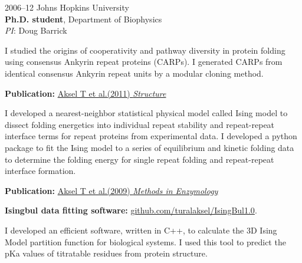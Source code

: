 \documentclass[12pt,letterpaper]{report}
\newcommand{\listitemspace}{0.25em}
\renewenvironment{itemize}
{\begin{list}{}{\setlength{\leftmargin}{0em}
                \setlength{\parskip}{0em}
                \setlength{\itemsep}{\listitemspace}
                \setlength{\parsep}{\listitemspace}}}
{\end{list}}
\begin{document}
\begin{tablist}
        \item[2006--12]\tab{}Johns Hopkins University \\
                             \textbf{Ph.D. student}, Department of Biophysics\\
                             \textit{PI}: Doug Barrick \\
                             \begin{itemize}
                                \item \textbullet \hspace{0.2cm} I studied the origins of cooperativity and pathway diversity in protein folding using consensus Ankyrin repeat proteins (CARPs). I generated CARPs from identical consensus Ankyrin repeat units by a modular cloning method. 
                                \begin{itemize}
                                    \item \hspace{1cm} \textbf{Publication:} \href{https://doi.org/10.1016/j.str.2010.12.018}{Aksel T et al.(2011) \textit{Structure}}
                                \end{itemize} 
                                \item \textbullet \hspace{0.2cm} I developed a nearest-neighbor statistical physical model called Ising model to dissect folding energetics into individual repeat stability and repeat-repeat interface terms for repeat proteins from experimental data. I developed a python package to fit the Ising model to a series of equilibrium and kinetic folding data to determine the folding energy for single repeat folding and repeat-repeat interface formation.
                                \begin{itemize}
                                    \item \hspace{1cm} \textbf{Publication:} \href{https://doi.org/10.1016/S0076-6879(08)04204-3}{Aksel T et al.(2009) \textit{Methods in Enzymology}}
                                    \item \hspace{1cm} \textbf{Isingbul data fitting software:} \href{https://github.com/turalaksel/IsingBul1.0} {github.com/turalaksel/IsingBul1.0}.
                                \end{itemize} 

                                \item \textbullet \hspace{0.2cm} I developed an efficient software, written in C++, to calculate the 3D Ising Model partition function for biological systems. I used this tool to predict the pKa values of titratable residues from protein structure.
                            \end{itemize} 
        

\end{tablist}
\end{document}
